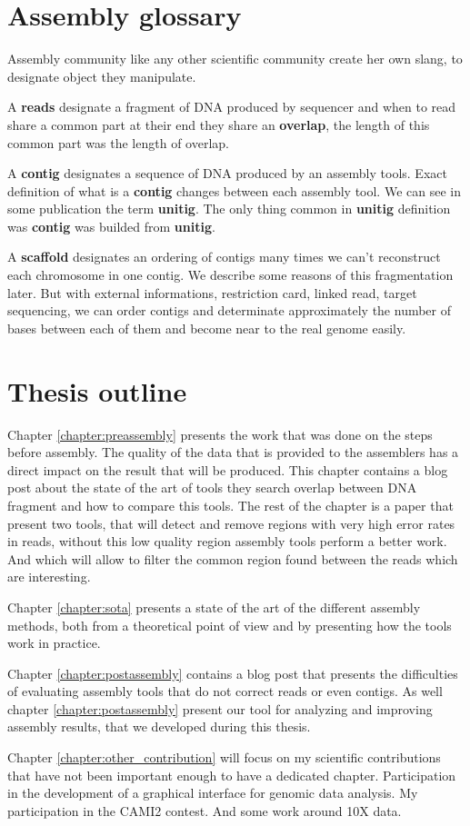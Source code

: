 \documentclass[./main.tex]{subfiles}
\begin{document}
\section{Assembly glossary} 

Assembly community like any other scientific community create her own slang, to designate object they manipulate.

A \textbf{reads} designate a fragment of DNA produced by sequencer and when to read share a common part at their end they share an \textbf{overlap}, the length of this common part was the length of overlap.

A \textbf{contig} designates a sequence of DNA produced by an assembly tools. Exact definition of what is a \textbf{contig} changes between each assembly tool. We can see in some publication the term \textbf{unitig}. The only thing common in \textbf{unitig} definition was \textbf{contig} was builded from \textbf{unitig}.

A \textbf{scaffold} designates an ordering of contigs many times we can't reconstruct each chromosome in one contig. We describe some reasons of this fragmentation later. But with external informations, restriction card, linked read, target sequencing, we can order contigs and determinate approximately the number of bases between each of them and become near to the real genome easily.

\section{Thesis outline}

Chapter \ref{chapter:preassembly} presents the work that was done on the steps before assembly. The quality of the data that is provided to the assemblers has a direct impact on the result that will be produced. This chapter contains a blog post about the state of the art of tools they search overlap between DNA fragment and how to compare this tools. The rest of the chapter is a paper that present two tools, \yacrd that will detect and remove regions with very high error rates in reads, without this low quality region assembly tools perform a better work. And \fpa which will allow to filter the common region found between the reads which are interesting.

Chapter \ref{chapter:sota} presents a state of the art of the different assembly methods, both from a theoretical point of view and by presenting how the tools work in practice.

Chapter \ref{chapter:postassembly} contains a blog post that presents the difficulties of evaluating assembly tools that do not correct reads or even contigs. As well chapter \ref{chapter:postassembly} present our tool for analyzing and improving assembly results, \knot that we developed during this thesis.

Chapter \ref{chapter:other_contribution} will focus on my scientific contributions that have not been important enough to have a dedicated chapter. Participation in the development of a graphical interface for genomic data analysis. My participation in the CAMI2 contest. And some work around 10X data.

\end{document}
